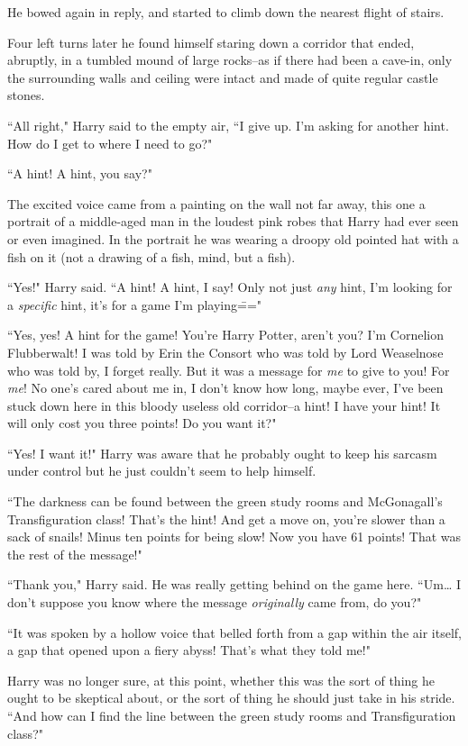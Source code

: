 He bowed again in reply, and started to climb down the nearest flight of stairs.

Four left turns later he found himself staring down a corridor that ended, abruptly, in a tumbled mound of large rocks\---as if there had been a cave-in, only the surrounding walls and ceiling were intact and made of quite regular castle stones.

``All right," Harry said to the empty air, ``I give up. I'm asking for another hint. How do I get to where I need to go?"

``A hint! A hint, you say?"

The excited voice came from a painting on the wall not far away, this one a portrait of a middle-aged man in the loudest pink robes that Harry had ever seen or even imagined. In the portrait he was wearing a droopy old pointed hat with a fish on it (not a drawing of a fish, mind, but a fish).

``Yes!" Harry said. ``A hint! A hint, I say! Only not just \emph{any} hint, I'm looking for a \emph{specific} hint, it's for a game I'm playing\==="

``Yes, yes! A hint for the game! You're Harry Potter, aren't you? I'm Cornelion Flubberwalt! I was told by Erin the Consort who was told by Lord Weaselnose who was told by, I forget really. But it was a message for \emph{me} to give to you! For \emph{me}! No one's cared about me in, I don't know how long, maybe ever, I've been stuck down here in this bloody useless old corridor\---a hint! I have your hint! It will only cost you three points! Do you want it?"

``Yes! I want it!" Harry was aware that he probably ought to keep his sarcasm under control but he just couldn't seem to help himself.

``The darkness can be found between the green study rooms and McGonagall's Transfiguration class! That's the hint! And get a move on, you're slower than a sack of snails! Minus ten points for being slow! Now you have 61 points! That was the rest of the message!"

``Thank you," Harry said. He was really getting behind on the game here. ``Um{\ldots} I don't suppose you know where the message \emph{originally} came from, do you?"

``It was spoken by a hollow voice that belled forth from a gap within the air itself, a gap that opened upon a fiery abyss! That's what they told me!"

Harry was no longer sure, at this point, whether this was the sort of thing he ought to be skeptical about, or the sort of thing he should just take in his stride. ``And how can I find the line between the green study rooms and Transfiguration class?"


